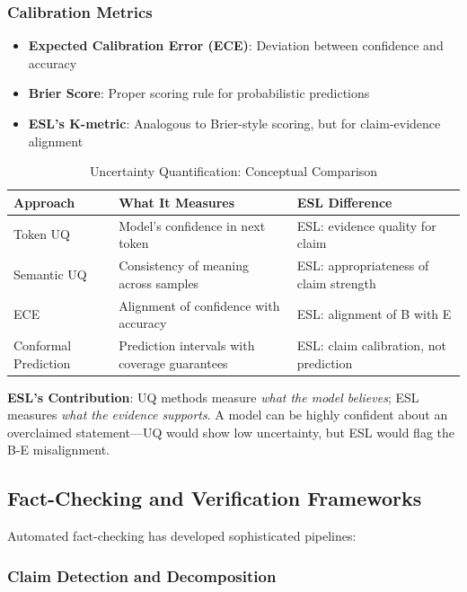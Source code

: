 \documentclass[11pt,a4paper]{article}
\begin{document}
\subsubsection{Calibration Metrics}

\begin{itemize}
    \item \textbf{Expected Calibration Error (ECE)}: Deviation between confidence and accuracy
    \item \textbf{Brier Score}: Proper scoring rule for probabilistic predictions
    \item \textbf{ESL's K-metric}: Analogous to Brier-style scoring, but for claim-evidence alignment
\end{itemize}

\begin{table}[h]
\centering
\caption{Uncertainty Quantification: Conceptual Comparison}
\label{tab:uq-comparison}
\begin{tabular}{lp{5cm}p{5cm}}
\toprule
\textbf{Approach} & \textbf{What It Measures} & \textbf{ESL Difference} \\
\midrule
Token UQ & Model's confidence in next token & ESL: evidence quality for claim \\
Semantic UQ & Consistency of meaning across samples & ESL: appropriateness of claim strength \\
ECE & Alignment of confidence with accuracy & ESL: alignment of B with E \\
Conformal Prediction & Prediction intervals with coverage guarantees & ESL: claim calibration, not prediction \\
\bottomrule
\end{tabular}
\end{table}

\textbf{ESL's Contribution}: UQ methods measure \textit{what the model believes}; ESL measures \textit{what the evidence supports}. A model can be highly confident about an overclaimed statement---UQ would show low uncertainty, but ESL would flag the B-E misalignment.

\subsection{Fact-Checking and Verification Frameworks}

Automated fact-checking has developed sophisticated pipelines:

\subsubsection{Claim Detection and Decomposition}
\end{document}
